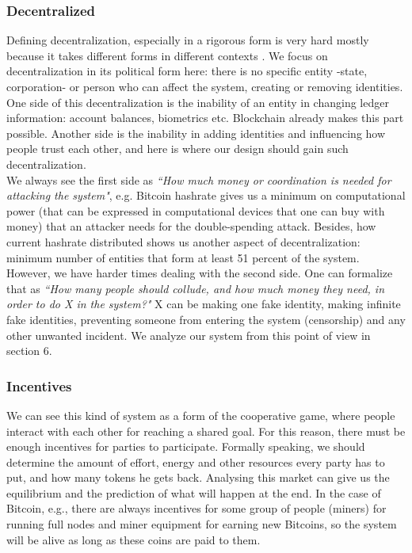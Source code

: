 \documentclass[conference]{IEEEtran}
\begin{document}
\subsubsection{Decentralized}
Defining decentralization, especially in a rigorous form is very hard mostly because it takes different forms in different contexts \cite{meaning-of-decentralization}. We focus on decentralization in its political form here: there is no specific entity -state, corporation- or person who can affect the system, creating or removing identities. One side of this decentralization is the inability of an entity in changing ledger information: account balances, biometrics etc. Blockchain already makes this part possible. Another side is the inability in adding identities and influencing how people trust each other, and here is where our design should gain such decentralization.
\\
We always see the first side as \textit{``How much money or coordination is needed for attacking the system"}, e.g. Bitcoin hashrate gives us a minimum on computational power (that can be expressed in computational devices that one can buy with money) that an attacker needs for the double-spending attack. Besides, how current hashrate distributed shows us another aspect of decentralization: minimum number of entities that form at least 51 percent of the system. However, we have harder times dealing with the second side. One can formalize that as \textit{``How many people should collude, and how much money they need, in order to do X in the system?"} X can be making one fake identity, making infinite fake identities, preventing someone from entering the system (censorship) and any other unwanted incident. We analyze our system from this point of view in section 6. 


\subsubsection{Incentives}
We can see this kind of system as a form of the cooperative game, where people interact with each other for reaching a shared goal. For this reason, there must be enough incentives for parties to participate. Formally speaking, we should determine the amount of effort, energy and other resources every party has to put, and how many tokens he gets back. Analysing this market can give us the equilibrium and the prediction of what will happen at the end. In the case of Bitcoin, e.g., there are always incentives for some group of people (miners) for running full nodes and miner equipment for earning new Bitcoins, so the system will be alive as long as these coins are paid to them.
\end{document}
